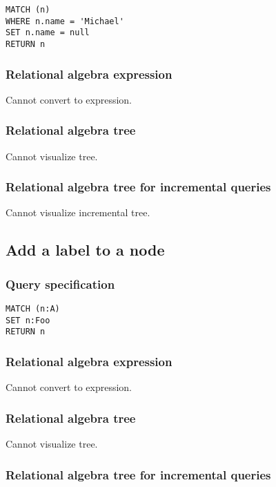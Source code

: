\begin{lstlisting}
MATCH (n)
WHERE n.name = 'Michael'
SET n.name = null
RETURN n
\end{lstlisting}

\subsubsection*{Relational algebra expression}

Cannot convert to expression.

\subsubsection*{Relational algebra tree}

Cannot visualize tree.

\subsubsection*{Relational algebra tree for incremental queries}

Cannot visualize incremental tree.

\subsection{Add a label to a node}

\subsubsection*{Query specification}

\begin{lstlisting}
MATCH (n:A)
SET n:Foo
RETURN n
\end{lstlisting}

\subsubsection*{Relational algebra expression}

Cannot convert to expression.

\subsubsection*{Relational algebra tree}

Cannot visualize tree.

\subsubsection*{Relational algebra tree for incremental queries}

